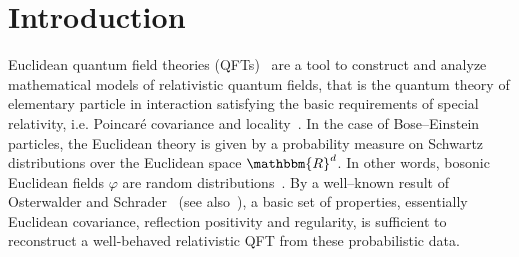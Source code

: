 \documentclass[11pt]{article}
\begin{document}
\newpage

{\tableofcontents}

\section{Introduction}

Euclidean quantum field theories
(QFTs)~{\cite{simon_po2_1974,glimm_quantum_1987,rivasseau_perturbative_1991}}
are a tool to construct and analyze mathematical models of relativistic
quantum fields, that is the quantum theory of elementary particle in
interaction satisfying the basic requirements of special relativity, i.e.
Poincar{\'e} covariance and
locality~{\cite{MR0277208,streater_pct_2000,jost_general_1965,bogolubov_general_1990,Haag1,Segalbook,MR1799198,strocchi_introduction_2013,friedrichs_mathematical_1953}}.
In the case of Bose--Einstein particles, the Euclidean theory is given by a
probability measure on Schwartz distributions over the Euclidean space
$\mathbbm{R}^d$. In other words, bosonic Euclidean fields $\varphi$ are random
distributions~{\cite{symanzik,nelson_construction_1973,MR1340626}}. By a
well--known result of Osterwalder and Schrader~{\cite{glimm_quantum_1987}}
(see also~{\cite{zinoviev_equivalence_1995}}), a basic set of properties,
essentially Euclidean covariance, reflection positivity and regularity, is
sufficient to reconstruct a well-behaved relativistic QFT from these
probabilistic data.
\end{document}
